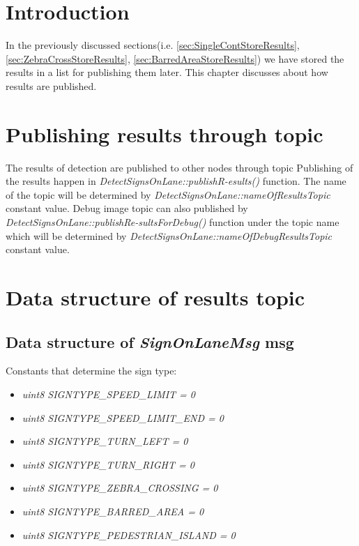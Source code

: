 \section{Introduction}
In the previously discussed sections(i.e. \autoref{sec:SingleContStoreResults}, \autoref{sec:ZebraCrossStoreResults}, \autoref{sec:BarredAreaStoreResults}) we have stored the results in a list for publishing them later. This chapter discusses about how results are published.

\section{Publishing results through topic}
The results of detection are published to other nodes through topic Publishing of the results happen in \emph{DetectSignsOnLane::publishR-esults()} function. The name of the topic will be determined by \emph{DetectSignsOnLane::nameOfResultsTopic} constant value. Debug image topic can also published by \emph{DetectSignsOnLane::publishRe-sultsForDebug()} function under the topic name which will be determined by \emph{DetectSignsOnLane::nameOfDebugResultsTopic} constant value.

\section{Data structure of results topic}
\subsection{Data structure of \emph{SignOnLaneMsg} msg}
\label{sec:DataStructureSignOnLane}
Constants that determine the sign type:
\begin{itemize}
    \item \emph{{\small uint8 SIGNTYPE\_SPEED\_LIMIT = 0}}
    \item \emph{{\small uint8 SIGNTYPE\_SPEED\_LIMIT\_END = 0}}
    \item \emph{{\small uint8 SIGNTYPE\_TURN\_LEFT = 0}}
    \item \emph{{\small uint8 SIGNTYPE\_TURN\_RIGHT = 0}}
    \item \emph{{\small uint8 SIGNTYPE\_ZEBRA\_CROSSING = 0}}
    \item \emph{{\small uint8 SIGNTYPE\_BARRED\_AREA = 0}}
    \item \emph{{\small uint8 SIGNTYPE\_PEDESTRIAN\_ISLAND = 0}}
\end{itemize}


